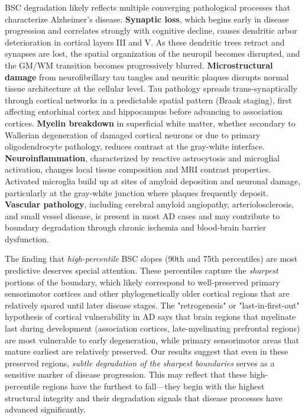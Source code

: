 \documentclass[blue]{ludusofficial}  %
\begin{document}
BSC degradation likely reflects multiple converging pathological processes that characterize Alzheimer's disease. \textbf{Synaptic loss}, which begins early in disease progression and correlates strongly with cognitive decline, causes dendritic arbor deterioration in cortical layers III and V. As these dendritic trees retract and synapses are lost, the spatial organization of the neuropil becomes disrupted, and the GM/WM transition becomes progressively blurred. \textbf{Microstructural damage} from neurofibrillary tau tangles and neuritic plaques disrupts normal tissue architecture at the cellular level. Tau pathology spreads trans-synaptically through cortical networks in a predictable spatial pattern (Braak staging), first affecting entorhinal cortex and hippocampus before advancing to association cortices. \textbf{Myelin breakdown} in superficial white matter, whether secondary to Wallerian degeneration of damaged cortical neurons or due to primary oligodendrocyte pathology, reduces contrast at the gray-white interface. \textbf{Neuroinflammation}, characterized by reactive astrocytosis and microglial activation, changes local tissue composition and MRI contrast properties. Activated microglia build up at sites of amyloid deposition and neuronal damage, particularly at the gray-white junction where plaques frequently deposit. \textbf{Vascular pathology}, including cerebral amyloid angiopathy, arteriolosclerosis, and small vessel disease, is present in most AD cases and may contribute to boundary degradation through chronic ischemia and blood-brain barrier dysfunction.

The finding that \textit{high-percentile} BSC slopes (90th and 75th percentiles) are most predictive deserves special attention. These percentiles capture the \textit{sharpest} portions of the boundary, which likely correspond to well-preserved primary sensorimotor cortices and other phylogenetically older cortical regions that are relatively spared until later disease stages. The "retrogenesis" or "last-in-first-out" hypothesis of cortical vulnerability in AD says that brain regions that myelinate last during development (association cortices, late-myelinating prefrontal regions) are most vulnerable to early degeneration, while primary sensorimotor areas that mature earliest are relatively preserved. Our results suggest that even in these preserved regions, \textit{subtle degradation of the sharpest boundaries} serves as a sensitive marker of disease progression. This may reflect that these high-percentile regions have the furthest to fall—they begin with the highest structural integrity and their degradation signals that disease processes have advanced significantly.
\end{document}
